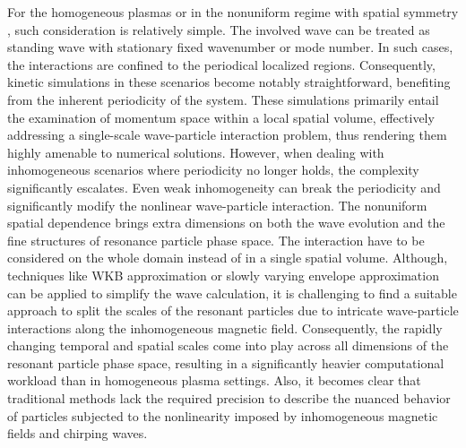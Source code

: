 For the homogeneous plasmas \cite{lilley2009,breizman2010} or in the nonuniform regime with spatial symmetry \cite{hezaveh2017,hezaveh2020,hezaveh2021}, such consideration is relatively simple.
The involved wave can be treated as standing wave with stationary fixed wavenumber or mode number. 
In such cases, the interactions are confined to the periodical localized regions. Consequently, kinetic simulations in these scenarios become notably straightforward, benefiting from the inherent periodicity of the system. These simulations primarily entail the examination of momentum space within a local spatial volume, effectively addressing a single-scale wave-particle interaction problem, thus rendering them highly amenable to numerical solutions.
However, when dealing with inhomogeneous scenarios where periodicity no longer holds, the complexity significantly escalates. Even weak inhomogeneity can break the periodicity and significantly modify the nonlinear wave-particle interaction.
The nonuniform spatial dependence brings extra dimensions on both the wave evolution and the fine structures of resonance particle phase space.
The interaction have to be considered on the whole domain instead of in a single spatial volume.
Although, techniques like WKB approximation \cite{wkb} or slowly varying envelope approximation \cite{svap} can be applied to simplify the wave calculation, it is challenging to find a suitable approach to split the scales of the resonant particles due to intricate wave-particle interactions along the inhomogeneous magnetic field.
Consequently, the rapidly changing temporal and spatial scales come into play across all dimensions of the resonant particle phase space, resulting in a significantly heavier computational workload than in homogeneous plasma settings.
Also, it becomes clear that traditional methods lack the required precision to describe the nuanced behavior of particles subjected to the nonlinearity imposed by inhomogeneous magnetic fields and chirping waves.

